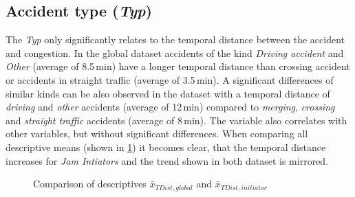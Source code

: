 \subsection{Accident type (\textit{Typ})}
\label{analysis_sum_Typ}
The \textit{Typ} only significantly relates to the temporal distance between the accident and congestion. In the global dataset accidents of the kind \textit{Driving accident} and \textit{Other} (average of 8.5\,min) have a longer temporal distance than crossing accident or accidents in straight traffic (average of 3.5\,min). A significant differences of similar kinds can be also observed in the  dataset with a temporal distance of \textit{driving} and \textit{other} accidents (average of 12\,min) compared to \textit{merging}, \textit{crossing} and \textit{straight traffic} accidents (average of 8\,min). The variable also correlates with other variables, but without significant differences. When comparing all descriptive means (shown in \cref{fig:baysis_summary_Typ_TDist_barplot}) it becomes clear, that the temporal distance increases for \textit{Jam Intiators}
and the trend shown in both dataset is mirrored.
\begin{figure}[ht!]
    \data
    \pgfplotstablesort[sort key=means, sort cmp=float >]{\datasorted}{\data}
    \tiny
    \centering
    \caption{Comparison of descriptives $\bar{x}_{TDist,global}$ and $\bar{x}_{TDist,initiator}$}
    \label{fig:baysis_summary_Typ_TDist_barplot}
\end{figure}

